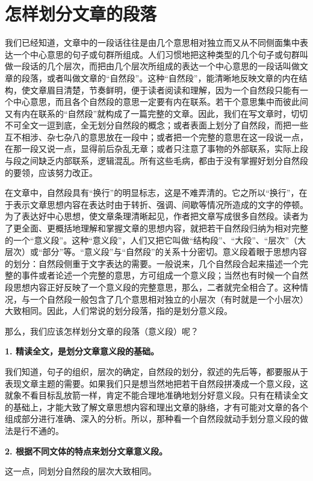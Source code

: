 \section{怎样划分文章的段落}

我们已经知道，文章中的一段话往往是由几个意思相对独立而又从不同侧面集中表达一个中心意思的句子或句群所组成。人们习惯地把这种类型的几个句子或句群叫做一段话的几个层次，而把由几个层次所组成的表达一个中心意思的一段话叫做文章的段落，或者叫做文章的“自然段”。这种“自然段”，能清晰地反映文章的内在结构，使文章眉目清楚，节奏鲜明，便于读者阅读和理解，因为一个自然段只能有一个中心意思，而且各个自然段的意思一定要有内在联系。若干个意思集中而彼此间又有内在联系的“自然段”就构成了一篇完整的文章。因此，我们在写文章时，切切不可全文一逗到底，全无划分自然段的概念；或者表面上划分了自然段，而把一些互不相涉、杂七杂八的意思放在一段中；或者把一个完整的意思在这一段说一点，在那一段又说一点，显得前后杂乱无章；或者只注意了事物的外部联系，实际上段与段之间缺乏内部联系，逻辑混乱。所有这些毛病，都由于没有掌握好划分自然段的要领，应该努力改正。

在文章中，自然段具有“换行”的明显标志，这是不难弄清的。它之所以“换行”，在于表示文章思想内容在表达时由于转折、强调、间歇等情况所造成的文字的停顿。为了表达好中心思想，使文章条理清晰起见，作者把文章写成很多自然段。读者为了更全面、更概括地理解和掌握文章的思想内容，就把若干自然段归纳为相对完整的一个“意义段”。这种“意义段”，人们又把它叫做“结构段”、“大段”、“层次”（大层次）或“部分”等。“意义段”与“自然段”的关系十分密切。意义段着眼于思想内容的划分：自然段侧重于文字表达的需要。一般说来，几个自然段合起来描述一个完整的事件或者论述一个完整的意思，方可组成一个意义段；当然也有时候一个自然段思想内容正好反映了一个意义段的完整意思，那么，二者就完全相合了。这种情况，与一个自然段一般包含了几个意思相对独立的小层次（有时就是一个小层次）大致相同。因此，人们常说的划分段落，指的是划分意义段。

那么，我们应该怎样划分文章的段落（意义段）呢？

\textbf{1. 精读全文，是划分文章意义段的基础。}

我们知道，句子的组织，层次的确定，自然段的划分，叙述的先后等，都要服从于表现文章主题的需要。如果我们只是想当然地把若干自然段拼凑成一个意义段，这就象不看目标乱放箭一样，肯定不能合理地准确地划分好意义段。只有在精读全文的基础上，才能大致了解文章思想内容和理出文章的脉络，才有可能对文章的各个组成部分进行准确、深入的分析。所以，那种看一个自然段就动手划分意义段的做法是行不通的。

\textbf{2. 根据不同文体的特点来划分文章意义段。}

这一点，同划分自然段的层次大致相同。

